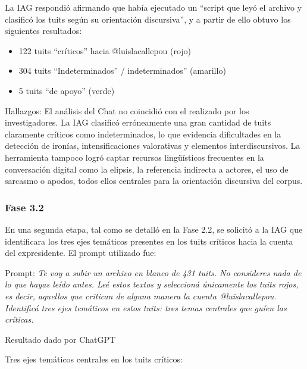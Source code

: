 \documentclass[spanish]{textolivre}
\begin{document}
La IAG respondió afirmando que había ejecutado un “script que leyó el archivo y clasificó los tuits según su orientación discursiva”, y a partir de ello obtuvo los siguientes resultados:

\begin{itemize}
    \item 122 tuits “críticos” hacia @luislacallepou (rojo)
    \item 304 tuits “Indeterminados” / indeterminados” (amarillo)
    \item 5 tuits “de apoyo” (verde)
\end{itemize}

Hallazgos: El análisis del Chat no coincidió con el realizado por los investigadores. La IAG clasificó erróneamente una gran cantidad de tuits claramente críticos como indeterminados, lo que evidencia dificultades en la detección de ironías, intensificaciones valorativas y elementos interdiscursivos. La herramienta tampoco logró captar recursos lingüísticos frecuentes en la conversación digital como la elipsis, la referencia indirecta a actores, el uso de sarcasmo o apodos, todos ellos centrales para la orientación discursiva del corpus.

\subsubsection{Fase 3.2}
En una segunda etapa, tal como se detalló en la Fase 2.2, se solicitó a la IAG que identificara los tres ejes temáticos presentes en los tuits críticos hacia la cuenta del expresidente. El prompt utilizado fue:

Prompt: \textit{Te voy a subir un archivo en blanco de 431 tuits. No consideres nada de lo que hayas leído antes. Leé estos textos y seleccioná únicamente los tuits rojos, es decir, aquellos que critican de alguna manera la cuenta @luislacallepou. Identificá tres ejes temáticos en estos tuits: tres temas centrales que guíen las críticas.}

Resultado dado por ChatGPT

Tres ejes temáticos centrales en los tuits críticos:
\end{document}
